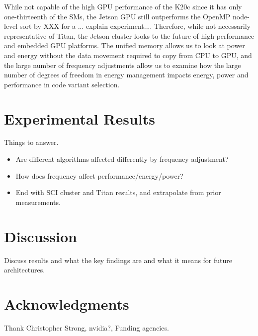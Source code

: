 \documentclass{sig-alternate}
\begin{document}
While not capable of the high GPU performance of the K20c
since it has only one-thirteenth of the SMs, the
Jetson GPU still outperforms the OpenMP node-level sort by XXX
{\color{red} for a ... explain experiment...}.  
Therefore, while not necessarily representative of Titan, 
the Jetson cluster looks to the future of high-performance and 
embedded GPU platforms.  The unified memory allows us to look 
at power and energy without the data movement required to copy
from CPU to GPU, and the large number of frequency adjustments
allow us to examine how the large number of degrees of freedom
in energy management impacts energy, power and performance in 
code variant selection. 

\section{Experimental Results}

{\color{red} Things to answer.}
\begin{itemize}
\item Are different algorithms affected differently by frequency adjustment?
\item How does frequency affect performance/energy/power?
\item End with SCI cluster and Titan results, and extrapolate from prior 
measurements.
\end{itemize}

\section{Discussion}
Discuss results and what the key findings are and what it means for future architectures.


\section{Acknowledgments}
Thank Christopher Strong, nvidia?, Funding agencies.


%

 

\end{document}

